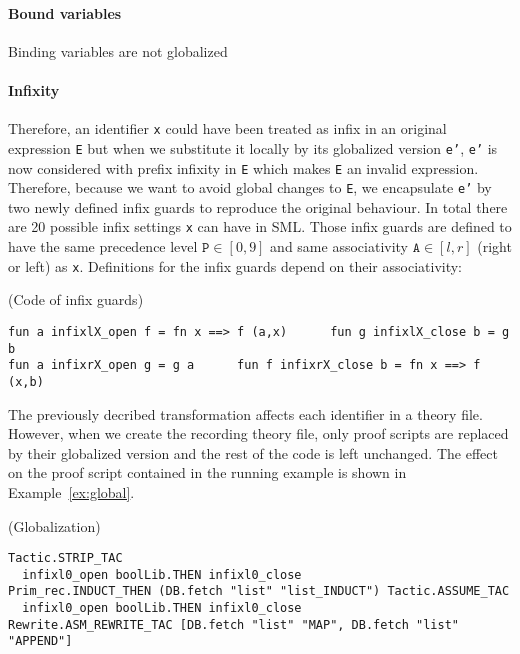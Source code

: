 \documentclass[runningheads,a4paper,draft]{svjour3}
\def\sml{\textsf{SML}\xspace}
\begin{document}
\paragraph{Bound variables}
Binding variables are not globalized



\paragraph{Infixity}
 Therefore, an identifier \texttt{x} could have been treated 
as infix in an original expression \texttt{E} but when 
we substitute it locally by its 
globalized version \texttt{e'}, \texttt{e'} is now considered with prefix 
infixity in \texttt{E} which makes \texttt{E} an invalid expression. Therefore, 
because we 
want to avoid global changes to \texttt{E}, we encapsulate \texttt{e'} by two 
newly 
defined 
infix guards to reproduce 
the original behaviour.
In total there are 20 possible infix settings \texttt{x} can have in \sml.
Those infix guards are defined to have the 
same 
precedence level $\texttt{P}\in[0,9]$ and same associativity 
$\texttt{A}\in[l,r]$ (right or left) as \texttt{x}.
Definitions for the infix guards depend on their associativity: 

\begin{definition}(Code of infix guards)
\begin{lstlisting}[language=SMLSmall,frame=tb]
fun a infixlX_open f = fn x ==> f (a,x)      fun g infixlX_close b = g b
fun a infixrX_open g = g a      fun f infixrX_close b = fn x ==> f (x,b) 
\end{lstlisting}
\end{definition}

The previously decribed transformation affects each identifier in a theory 
file. However, when we 
create the recording theory file, only proof scripts are replaced by their 
globalized version and the rest of the code is left unchanged. The effect on 
the proof script contained in the running example is shown in 
Example~\ref{ex:global}.



\begin{example} (Globalization)
\begin{lstlisting}[language=SMLSmall,frame=tb]
Tactic.STRIP_TAC 
  infixl0_open boolLib.THEN infixl0_close
Prim_rec.INDUCT_THEN (DB.fetch "list" "list_INDUCT") Tactic.ASSUME_TAC
  infixl0_open boolLib.THEN infixl0_close
Rewrite.ASM_REWRITE_TAC [DB.fetch "list" "MAP", DB.fetch "list" "APPEND"]
\end{lstlisting}
\end{example} 
\end{document}

